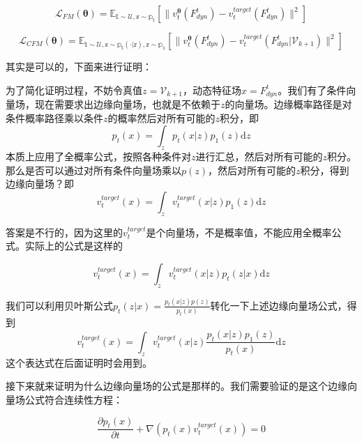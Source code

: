     \begin{equation}\mathcal{L}_{FM}(\bm{\theta}) = \mathbb{E_{t\sim\mathcal{U},x\sim p_t}} \left[\lVert v_t^\bm{\theta}(F_{dyn}^{t}) - v_t^{target}(F_{dyn}^{t}) \rVert^2 \right]\label{loss_fm}\end{equation}

    \begin{equation}\mathcal{L}_{CFM}(\bm{\theta}) = \mathbb{E_{t\sim\mathcal{U},x\sim p_t(\cdot|z),z\sim p_1}} \left[\lVert v_t^\bm{\theta}(F_{dyn}^{t}) - v_t^{target}(F_{dyn}^{t}|\mathcal{V}_{k+1}) \rVert^2 \right]\label{loss_cfm}\end{equation}

    其实是可以的，下面来进行证明：

    为了简化证明过程，不妨令真值$z = \mathcal{V}_{k+1}$，动态特征场$x = F_{dyn}^{t}$。我们有了条件向量场，现在需要求出边缘向量场，也就是不依赖于$z$的向量场。边缘概率路径是对条件概率路径乘以条件$z$的概率然后对所有可能的$z$积分，即
    \begin{equation}p_t(x) = \int_{z} p_t(x|z)p_1(z)\mathrm{d}z\end{equation}
    本质上应用了全概率公式，按照各种条件对$z$进行汇总，然后对所有可能的$z$积分。那么是否可以通过对所有条件向量场乘以$p(z)$，然后对所有可能的$z$积分，得到边缘向量场？即
    \begin{equation}v_t^{target}(x) = \int_{z} v_t^{target}(x|z)p_1(z)\mathrm{d}z\end{equation}

    答案是不行的，因为这里的$v_t^{target}$是个向量场，不是概率值，不能应用全概率公式。实际上的公式是这样的

    \begin{equation}v_t^{target}(x) = \int_{z} v_t^{target}(x|z)p_t(z|x)\mathrm{d}z\end{equation}

    我们可以利用贝叶斯公式$p_t(z|x)=\frac{p_t(x|z)p(z)}{p_t(x)}$转化一下上述边缘向量场公式，得到
    \begin{equation}v_t^{target}(x) = \int_{z} v_t^{target}(x|z)\frac{p_t(x|z)p_1(z)}{p_t(x)}\mathrm{d}z\end{equation}
    这个表达式在后面证明时会用到。

    接下来就来证明为什么边缘向量场的公式是那样的。我们需要验证的是这个边缘向量场公式符合连续性方程：

    \begin{equation}\frac{\partial p_t(x)}{\partial t} + \nabla \left(p_t(x) v_t^{target}(x)\right) =0\end{equation}

